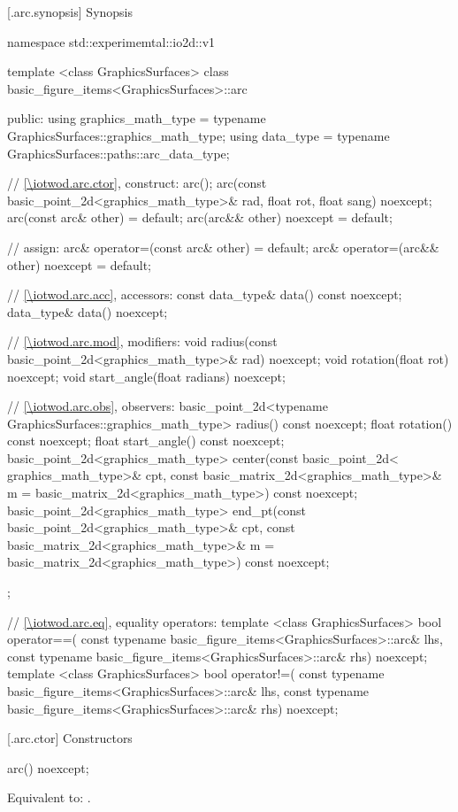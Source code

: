  [\iotwod.arc.synopsis] {Synopsis}
\begin{codeblock}
namespace std::experimemtal::io2d::v1 {
  template <class GraphicsSurfaces>
  class basic_figure_items<GraphicsSurfaces>::arc {
  public:
    using graphics_math_type = typename GraphicsSurfaces::graphics_math_type;
    using data_type =
      typename GraphicsSurfaces::paths::arc_data_type;

    // \ref{\iotwod.arc.ctor}, construct:
    arc();
    arc(const basic_point_2d<graphics_math_type>& rad, float rot, float sang) noexcept;
    arc(const arc& other) = default;
    arc(arc&& other) noexcept = default;

    // assign:
    arc& operator=(const arc& other) = default;
    arc& operator=(arc&& other) noexcept = default;

    // \ref{\iotwod.arc.acc}, accessors:
    const data_type& data() const noexcept;
    data_type& data() noexcept;

    // \ref{\iotwod.arc.mod}, modifiers:
    void radius(const basic_point_2d<graphics_math_type>& rad) noexcept;
    void rotation(float rot) noexcept;
    void start_angle(float radians) noexcept;

    // \ref{\iotwod.arc.obs}, observers:
    basic_point_2d<typename GraphicsSurfaces::graphics_math_type> radius() const noexcept;
    float rotation() const noexcept;
    float start_angle() const noexcept;
    basic_point_2d<graphics_math_type> center(const basic_point_2d< graphics_math_type>& cpt,
      const basic_matrix_2d<graphics_math_type>& m =
        basic_matrix_2d<graphics_math_type>{}) const noexcept;
    basic_point_2d<graphics_math_type> end_pt(const basic_point_2d<graphics_math_type>& cpt,
      const basic_matrix_2d<graphics_math_type>& m =
        basic_matrix_2d<graphics_math_type>{}) const noexcept;
  };

  // \ref{\iotwod.arc.eq}, equality operators:
  template <class GraphicsSurfaces>
  bool operator==(
    const typename basic_figure_items<GraphicsSurfaces>::arc& lhs,
    const typename basic_figure_items<GraphicsSurfaces>::arc& rhs) 
    noexcept;  
  template <class GraphicsSurfaces>
  bool operator!=(
    const typename basic_figure_items<GraphicsSurfaces>::arc& lhs,
    const typename basic_figure_items<GraphicsSurfaces>::arc& rhs) 
    noexcept;  
}
\end{codeblock}

 [\iotwod.arc.ctor] {Constructors}%

%
\begin{itemdecl}
arc() noexcept;
\end{itemdecl}
\begin{itemdescr}
\pnum
\effects Equivalent to: .
\end{itemdescr}

